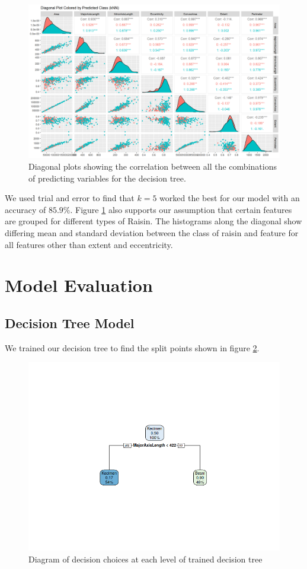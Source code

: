 \documentclass{article}
\begin{document}
\begin{figure}[h]
    \centering
    \includegraphics[width=1\linewidth]{diagonal.png}
    \caption{Diagonal plots showing the correlation between all the combinations of predicting variables for the decision tree.}
    \label{fig:enter-label}
\end{figure}

We used trial and error to find that $k = 5$ worked the best for our model with an accuracy of $85.9\%$. Figure \ref{fig:enter-label} also supports our assumption that certain features are grouped for different types of Raisin. The histograms along the diagonal show differing mean and standard deviation between the class of raisin and feature for all features other than extent and eccentricity. 


\newpage
\section{Model Evaluation}

\subsection{Decision Tree Model}
We trained our decision tree to find the split points shown in figure \ref{fig:treePlot}.

\begin{figure}[h]
    \centering
    \includegraphics[width=0.7\linewidth]{tree_plot.png}
    \caption{Diagram of decision choices at each level of trained decision tree}
    \label{fig:treePlot}
\end{figure}
\end{document}
